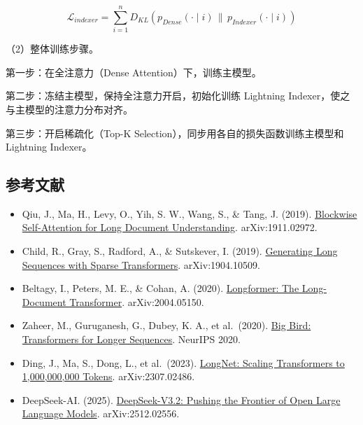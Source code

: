 \[
\mathcal{L}_{indexer}
= \sum_{i=1}^{n} D_{KL}\left(p_{Dense}(\cdot \mid i) \,\|\, p_{Indexer}(\cdot \mid i)\right)
\]

（2）整体训练步骤。

第一步：在全注意力（Dense Attention）下，训练主模型。

第二步：冻结主模型，保持全注意力开启，初始化训练 Lightning Indexer，使之与主模型的注意力分布对齐。

第三步：开启稀疏化（Top-K Selection），同步用各自的损失函数训练主模型和 Lightning Indexer。

\FloatBarrier
{}
\hypertarget{ux53c2ux8003ux6587ux732e-97}{%
\subsection{参考文献}\label{ux53c2ux8003ux6587ux732e-97}}

\vspace{0.25em}
\begin{itemize}
\tightlist
\item
  Qiu, J., Ma, H., Levy, O., Yih, S. W., Wang, S., \& Tang, J. (2019). \href{https://arxiv.org/abs/1911.02972}{Blockwise Self-Attention for Long Document Understanding}. arXiv:1911.02972.
\item
  Child, R., Gray, S., Radford, A., \& Sutskever, I. (2019). \href{https://arxiv.org/abs/1904.10509}{Generating Long Sequences with Sparse Transformers}. arXiv:1904.10509.
\item
  Beltagy, I., Peters, M. E., \& Cohan, A. (2020). \href{https://arxiv.org/abs/2004.05150}{Longformer: The Long-Document Transformer}. arXiv:2004.05150.
\item
  Zaheer, M., Guruganesh, G., Dubey, K. A., et al.~(2020). \href{https://arxiv.org/abs/2007.14062}{Big Bird: Transformers for Longer Sequences}. NeurIPS 2020.
\item
  Ding, J., Ma, S., Dong, L., et al.~(2023). \href{https://arxiv.org/abs/2307.02486}{LongNet: Scaling Transformers to 1,000,000,000 Tokens}. arXiv:2307.02486.
\item
  DeepSeek-AI. (2025). \href{https://arxiv.org/abs/2512.02556}{DeepSeek-V3.2: Pushing the Frontier of Open Large Language Models}. arXiv:2512.02556.
\end{itemize}

\clearpage
